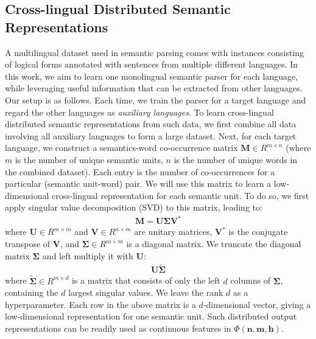 \documentclass[11pt,a4paper]{article}
\begin{document}
{{\subsection{Cross-lingual Distributed Semantic Representations}
\label{sec:semantic_embedding}


A multilingual dataset used in semantic parsing comes with instances consisting of logical forms annotated with sentences from multiple different languages.
In this work, we aim to learn one monolingual semantic parser for each language, while leveraging useful information that can be extracted from other languages.
Our setup is as follows. Each time, we train the parser for a target language and regard the other languages as {\em auxiliary languages}.
To learn cross-lingual distributed semantic representations from such data,
we first combine all data involving all auxiliary languages to form a large dataset.
Next,
for each target language, we  construct a semantics-word co-occurrence matrix ${\mathbf{M}}\in{R}^{m\times n}$ (where $m$ is the number of unique semantic units, $n$ is the number of unique words in the combined dataset).
Each entry is the number of co-occurrences for a particular (semantic unit-word) pair.
We will use this matrix to learn a low-dimensional cross-lingual representation for each semantic unit.
To do so, we first apply singular value decomposition (SVD) to this matrix, leading to:
\begin{gather}
\mathbf{M} = \mathbf{U}\mathbf{\Sigma}\mathbf{V^\ast}
\end{gather}
where ${\mathbf{U}}\in{R}^{m\times m}$ and ${\mathbf{V}}\in{R}^{n\times m}$ are unitary matrices, ${\mathbf V}^\ast$ is the conjugate transpose of ${\mathbf V}$, and $\mathbf{\Sigma}\in R^{m\times m}$ is a diagonal matrix.
We truncate the diagonal matrix ${\mathbf{\Sigma}}$ and left multiply it with $\mathbf{U}$:
\begin{gather}
\mathbf{U}\mathbf{\tilde{\Sigma}}
\end{gather}
where $\mathbf{\tilde{\Sigma}}\in R^{m\times d}$ is a matrix that consists of only the left $d$ columns of $\mathbf{\Sigma}$, containing the $d$ largest singular values.
We leave the rank $d$ as a hyperparameter.
Each row in the above matrix is a $d$-dimensional vector, giving a low-dimensional representation for one semantic unit.
Such distributed output representations can be readily used as continuous features in $\Phi{(\mathbf{n},\mathbf{m},\mathbf{h})}$.



}}
\end{document}
